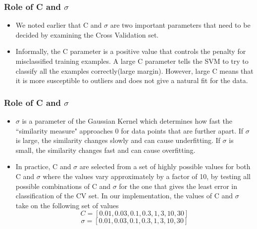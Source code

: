 \documentclass[11pt,xcolor=dvipsnames]{beamer}
\begin{document}
\begin{frame}
\frametitle{Role of C and $\sigma$}
\begin{itemize}
\item We noted earlier that C and $\sigma$ are two important parameters that need to be decided by examining the Cross Validation set.\\
\item  Informally, the C parameter is a positive value that controls the penalty for misclassified training examples. A large C parameter tells the SVM to try to classify all the examples correctly(large margin). However, large C means that it is more susceptible to outliers and does not give a natural fit for the data.
\end{itemize}
\end{frame}


\begin{frame}
\frametitle{Role of C and $\sigma$}
\begin{itemize}
\item $\sigma$ is a parameter of the Gaussian Kernel which determines how fast the ``similarity measure" approaches 0 for data points that are further apart. If $\sigma$ is large, the similarity changes slowly and can cause underfitting. If $\sigma$ is small, the similarity changes fast and can cause overfitting.\\
\item In practice, C and $\sigma$ are selected from a set of highly possible values for both C and $\sigma$ where the values vary approximately by a factor of 10, by testing all possible combinations of C and $\sigma$ for the one that gives the least error in classification of the CV set. In our implementation, the values of C and $\sigma$ take on the following set of values
\begin{displaymath}C = [0.01, 0.03, 0.1, 0.3, 1, 3, 10, 30]\end{displaymath}
\begin{displaymath}\sigma = [0.01, 0.03, 0.1, 0.3, 1, 3, 10, 30]\end{displaymath}
\end{itemize}
\end{frame}
\end{document}

